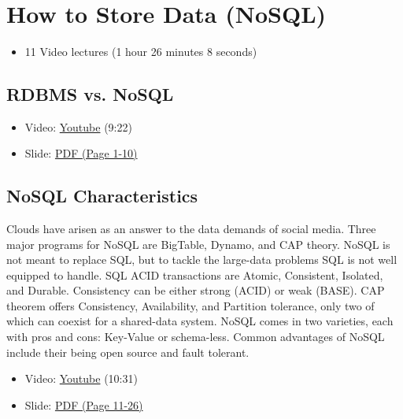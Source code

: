 \FILENAME\

\section{How to Store Data (NoSQL)}\label{how-to-store-data-nosql}

\begin{itemize}

\item
  11 Video lectures (1 hour 26 minutes 8 seconds)
\end{itemize}

\subsection{RDBMS vs. NoSQL}\label{rdbms-vs.-nosql}

\begin{itemize}

\item
  Video: \href{https://www.youtube.com/watch?v=dJunqER9lb8}{Youtube}
  (9:22)
\item
  Slide:
  \href{https://drive.google.com/open?id=0B88HKpainTSfaDFNbjNiMm44bnc}{PDF
  (Page 1-10)}
\end{itemize}

\subsection{NoSQL Characteristics}\label{nosql-characteristics}

Clouds have arisen as an answer to the data demands of social media.
Three major programs for NoSQL are BigTable, Dynamo, and CAP theory.
NoSQL is not meant to replace SQL, but to tackle the large-data problems
SQL is not well equipped to handle. SQL ACID transactions are Atomic,
Consistent, Isolated, and Durable. Consistency can be either strong
(ACID) or weak (BASE). CAP theorem offers Consistency, Availability, and
Partition tolerance, only two of which can coexist for a shared-data
system. NoSQL comes in two varieties, each with pros and cons: Key-Value
or schema-less. Common advantages of NoSQL include their being open
source and fault tolerant.

\begin{itemize}

\item
  Video: \href{https://www.youtube.com/watch?v=BjtTDiKhqk8}{Youtube}
  (10:31)
\item
  Slide:
  \href{https://drive.google.com/open?id=0B88HKpainTSfaDFNbjNiMm44bnc}{PDF
  (Page 11-26)}
\end{itemize}

